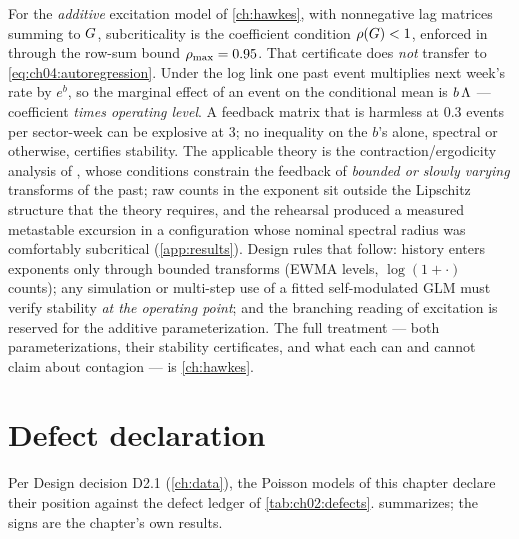 \begin{warning}\label{warn:ch04:loglinkstability}
For the \emph{additive} excitation model of \cref{ch:hawkes}, with
nonnegative lag matrices summing to $G$, subcriticality is the
coefficient condition $\rho\!\left(G\right) < 1$, enforced in
 through the row-sum bound $\rho_{\max} = 0.95$.
That certificate does \emph{not} transfer to
\cref{eq:ch04:autoregression}. Under the log link one past event
multiplies next week's rate by $e^{b}$, so the marginal effect of an
event on the conditional mean is $b\,\Lambda$ --- coefficient \emph{times
operating level}. A feedback matrix that is harmless at $0.3$ events per
sector-week can be explosive at $3$; no inequality on the $b$'s alone,
spectral or otherwise, certifies stability. The applicable theory is the
contraction/ergodicity analysis of \citet{fokianos2011}, whose conditions
constrain the feedback of \emph{bounded or slowly varying} transforms of
the past; raw counts in the exponent sit outside the Lipschitz structure
that the theory requires, and the rehearsal produced a measured
metastable excursion in a configuration whose nominal spectral radius was
comfortably subcritical (\cref{app:results}). Design rules that follow:
history enters exponents only through bounded transforms (EWMA levels,
$\log(1+\cdot)$ counts); any simulation or multi-step use of a fitted
self-modulated GLM must verify stability \emph{at the operating point};
and the branching reading of excitation is reserved for the additive
parameterization. The full treatment --- both parameterizations, their
stability certificates, and what each can and cannot claim about
contagion --- is \cref{ch:hawkes}.
\end{warning}

\section{Defect declaration}\label{ch04:sec:defects}

Per Design decision D2.1 (\cref{ch:data}), the Poisson models of this
chapter declare their position against the defect ledger of
\cref{tab:ch02:defects}.  summarizes; the signs
are the chapter's own results.

